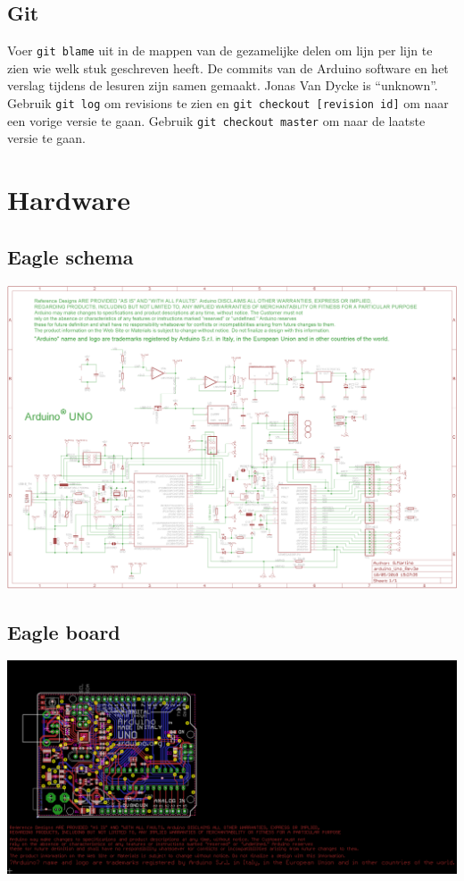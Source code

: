\documentclass[a4paper]{report}
\begin{document}
\section{Git}
Voer \verb!git blame! uit in de mappen van de gezamelijke delen om lijn per lijn te zien wie welk stuk geschreven heeft.
De commits van de Arduino software en het verslag tijdens de lesuren zijn samen gemaakt.
Jonas Van Dycke is ``unknown''.
Gebruik \verb!git log! om revisions te zien en \verb!git checkout [revision id]! om naar een vorige versie te gaan.
Gebruik \verb!git checkout master! om naar de laatste versie te gaan.

\chapter{Hardware}
\section{Eagle schema}
\includegraphics[width=\textwidth]{ArduinoUno_Schema}

\section{Eagle board}
\includegraphics[width=\textwidth]{ArduinoUno_Board}
\end{document}
